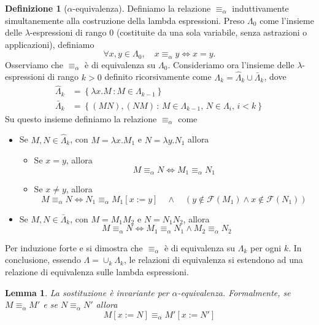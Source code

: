 \documentclass[a4paper,11pt]{article}
\newtheorem{lemma}{Lemma}
\theoremstyle{definition}
\newtheorem{defn}{Definizione}
\newcommand{\FF}{\mathcal{F}}
\begin{document}
\begin{defn}[$\alpha$-equivalenza]
  Definiamo la relazione $\equiv_\alpha$ induttivamente simultanemente alla costruzione
  della lambda espressioni.
  Preso $\Lambda_0$ come l'insieme delle $\lambda$-espressioni di rango $0$
  (costituite da una sola variabile, senza astrazioni o applicazioni), definiamo
  \[
    \forall x,y \in \Lambda_0,\quad x\equiv_\alpha y\iff x=y.
  \]
  Osserviamo che $\equiv_\alpha$ è di equivalenza su $\Lambda_0$.
  Consideriamo ora l'insieme delle $\lambda$-espressioni di rango $k>0$
  definito ricorsivamente come $\Lambda_k=\hat \Lambda_k\cup \bar \Lambda_k$,
  dove
  \[
    \begin{aligned}
      \hat \Lambda_k &=\left\{ \lambda
      x.M\,:M\in\Lambda_{k-1}\right\}\\
      \bar \Lambda_k&=\left\{ (MN), (NM)\,:\, M\in\Lambda_{k-1},\,N\in\Lambda_i,\,i<k \right\}
    \end{aligned}
  \]
  Su questo insieme definiamo la relazione $\equiv_\alpha$ come
  \begin{itemize}
    \item Se $M,N\in\hat\Lambda_{k}$, con $M=\lambda x.M_1$ e $N=\lambda y.N_1$
      allora
      \begin{itemize}
        \item Se $x=y$, allora
          \[
            M\equiv_\alpha N \iff M_1\equiv_\alpha N_1
          \]
        \item Se $x\ne y$, allora
          \[
            M\equiv_\alpha N \iff N_1\equiv_\alpha M_1[x:=y]\quad\wedge\quad
            (y\not\in\FF(M_1) \wedge x\not\in\FF(N_1))
          \]
      \end{itemize}
    \item Se $M,N\in\bar\Lambda_k$, con $M=M_1M_2$ e $N=N_1N_2$, allora
      \[
        M\equiv_\alpha N \iff M_1\equiv_\alpha N_1\wedge M_2\equiv_\alpha N_2
      \]
  \end{itemize}
  Per induzione forte e  si dimostra che $\equiv_\alpha$ è di equivalenza
  su $\Lambda_k$ per ogni $k$. In conclusione, essendo $\Lambda=\cup_k \Lambda_k$, 
  le relazioni di equivalenza si estendono ad una relazione di equivalenza 
  sulle lambda espressioni.
\end{defn}



\begin{lemma}
  La sostituzione è invariante per $\alpha$-equivalenza. Formalmente, se
  $M\equiv_\alpha M'$ e se $N\equiv_\alpha N'$ allora
  \[
    M[x:= N] \equiv_\alpha M'[x:=N']
  \]
\end{lemma}
\end{document}
